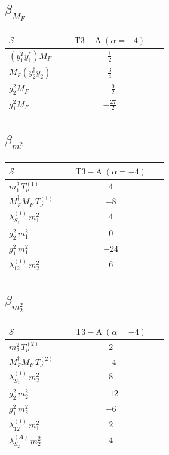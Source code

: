 \documentclass[9pt]{article}
\begin{document}
\subsection*{$ \beta_{M_F} $}
\begin{longtable}{@{}p{0.31\linewidth}c@{}}
\toprule
$\mathcal{S}$ & $ \mathrm{T3-A}\;(\alpha=-4) $ \\
\midrule
$ (y_1^T y_1^*)M_F $ & $ \frac{1}{2} $ \\
$ M_F(y_2^\dagger y_2) $ & $ \frac{3}{4} $ \\
$ g_2^2M_F $ & $ - \frac{9}{2} $ \\
$ g_1^2M_F $ & $ - \frac{27}{2} $ \\
\bottomrule
\end{longtable}
\subsection*{$ \beta_{m_1^{2}} $}
\begin{longtable}{@{}p{0.31\linewidth}c@{}}
\toprule
$\mathcal{S}$ & $ \mathrm{T3-A}\;(\alpha=-4) $ \\
\midrule
$ m_1^{2}\,T_{\nu}^{(1)} $ & $ 4 $ \\
$ M_F^\dagger M_F\,T_{\nu}^{(1)} $ & $ -8 $ \\
$ \lambda_{S_1}^{(1)}\,m_1^{2} $ & $ 4 $ \\
$ g_2^2\,m_1^{2} $ & $ 0 $ \\
$ g_1^2\,m_1^{2} $ & $ -24 $ \\
$ \lambda_{12}^{(1)}\,m_2^{2} $ & $ 6 $ \\
\bottomrule
\end{longtable}
\subsection*{$ \beta_{m_2^{2}} $}
\begin{longtable}{@{}p{0.31\linewidth}c@{}}
\toprule
$\mathcal{S}$ & $ \mathrm{T3-A}\;(\alpha=-4) $ \\
\midrule
$ m_2^{2}\,T_{\nu}^{(2)} $ & $ 2 $ \\
$ M_F^\dagger M_F\,T_{\nu}^{(2)} $ & $ -4 $ \\
$ \lambda_{S_2}^{(1)}\,m_2^{2} $ & $ 8 $ \\
$ g_2^2\,m_2^{2} $ & $ -12 $ \\
$ g_1^2\,m_2^{2} $ & $ -6 $ \\
$ \lambda_{12}^{(1)}\,m_1^{2} $ & $ 2 $ \\
$ \lambda_{S_2}^{(A)}\,m_2^{2} $ & $ 4 $ \\
\bottomrule
\end{longtable}
\end{document}
